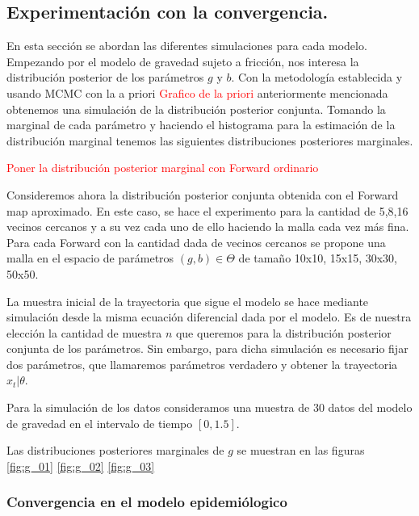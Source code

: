 \newpage

\newpage

\newpage

\subsection{Experimentación con la convergencia.}

En esta sección se abordan las diferentes simulaciones para cada modelo. Empezando por el modelo de gravedad sujeto a fricción, nos interesa la distribución posterior de los parámetros $g$ y $b$. Con la metodología establecida y usando MCMC con la a priori \textcolor{red}{Grafico de la priori} anteriormente mencionada obtenemos una simulación de la distribución posterior conjunta. Tomando la marginal de cada parámetro y haciendo el histograma para la estimación de la distribución marginal tenemos las siguientes distribuciones posteriores marginales.


\textcolor{red}{Poner la distribución posterior marginal con Forward ordinario}

Consideremos ahora la distribución posterior conjunta obtenida con el Forward map aproximado. En este caso, se hace el experimento para la cantidad de 5,8,16 vecinos cercanos y a su vez cada uno de ello haciendo la malla cada vez más fina. Para cada Forward con la cantidad dada de vecinos cercanos se propone una malla en el espacio de parámetros $(g,b)\in \Theta$ de tamaño 10x10, 15x15, 30x30, 50x50.

La muestra inicial de la trayectoria que sigue el modelo se hace mediante simulación desde la misma ecuación diferencial dada por el modelo. Es de nuestra elección la cantidad de muestra $n$ que queremos para la distribución posterior conjunta de los parámetros. Sin embargo, para dicha simulación es necesario fijar dos parámetros, que llamaremos parámetros verdadero y obtener la trayectoria $x_t|\theta$. 

Para la simulación de los datos consideramos una muestra de 30 datos del modelo de gravedad en el intervalo de tiempo $[0,1.5]$. 

Las distribuciones posteriores marginales de $g$ se muestran en las figuras \ref{fig:g_01} \ref{fig:g_02}    \ref{fig:g_03} 



\newpage


\subsubsection{Convergencia en el modelo epidemiólogico}

